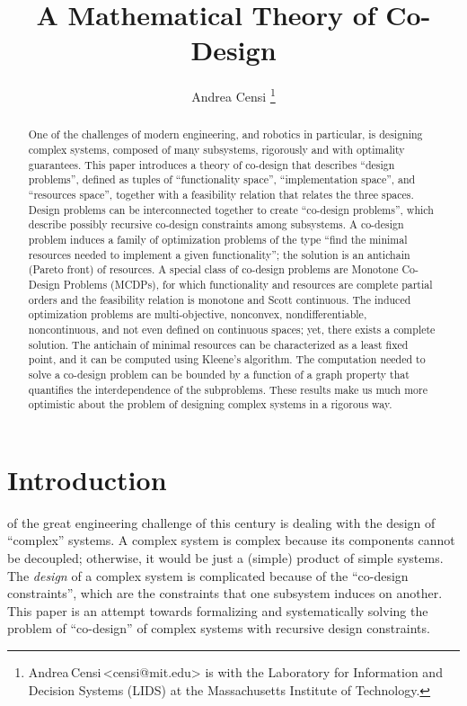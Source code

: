 \documentclass[twocolumn,english]{IEEEtran}
\makeatletter
\theoremstyle{definition}
\theoremstyle{plain}
\theoremstyle{definition}
\theoremstyle{remark}
\theoremstyle{definition}
\theoremstyle{plain}
\theoremstyle{plain}
\newcommand{\person}[2]{#1\,{\footnotesize<#2>\rm}}
\newcommand{\mythanks}{
  \protect\thanks{\person{Andrea\,Censi}{censi@mit.edu} is with the
  Laboratory for Information and Decision Systems (LIDS)
  at the Massachusetts Institute of Technology. 
}}
\newcommand{\firstpage}{
\AddToShipoutPictureBG*{
  \AtPageUpperLeft{
    \setlength\unitlength{1in}
    \hspace*{\dimexpr0.5\paperwidth\relax}
    \makebox(0,-0.75)[r]{This version: Sep 2016 - Last version at: \url{http://tiny.cc/co-design}}
}}
}
\renewcommand{\firstpage}{}
\makeatother
\begin{document}
\firstpage


\title{\vspace{-5mm}\huge A Mathematical Theory of Co-Design}

\author{Andrea Censi\mythanks}
\maketitle
\begin{abstract}
One of the challenges of modern engineering, and robotics in particular,
is designing complex systems, composed of many subsystems, rigorously
and with optimality guarantees. This paper introduces a theory of
co-design that describes ``design problems'', defined as tuples
of ``functionality space'', ``implementation space'', and ``resources
space'', together with a feasibility relation that relates the three
spaces. Design problems can be interconnected together to create ``co-design
problems'', which describe possibly recursive co-design constraints
among subsystems. A co-design problem induces a family of optimization
problems of the type ``find the minimal resources needed to implement
a given functionality''; the solution is an antichain (Pareto front)
of resources. A special class of co-design problems are Monotone Co-Design
Problems (MCDPs), for which functionality and resources are complete
partial orders and the feasibility relation is monotone and Scott
continuous. The induced optimization problems are multi-objective,
nonconvex, nondifferentiable, noncontinuous, and not even defined
on continuous spaces; yet, there exists a complete solution. The antichain
of minimal resources can be characterized as a least fixed point,
and it can be computed using Kleene's algorithm. The computation needed
to solve a co-design problem can be bounded by a function of a graph
property that quantifies the interdependence of the subproblems. These
results make us much more optimistic about the problem of designing
complex systems in a rigorous way.  
\end{abstract}





\section{Introduction}

 of the great engineering challenge of this
century is dealing with the design of ``complex'' systems. A complex
system is complex because its components cannot be decoupled; otherwise,
it would be just a (simple) product of simple systems. The \emph{design}
of a complex system is complicated because of the ``co-design constraints'',
which are the constraints that one subsystem induces on another. This
paper is an attempt towards formalizing and systematically solving
the problem of ``co-design'' of complex systems with recursive design
constraints.
\end{document}
